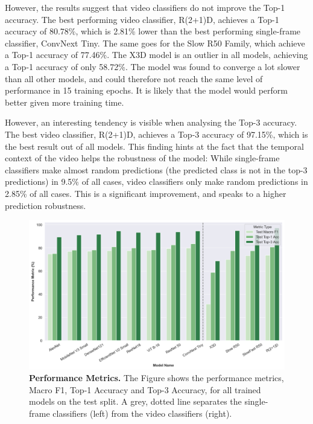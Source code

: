 \documentclass[a4paper]{article}
\begin{document}
However, the results suggest that video classifiers do not improve the Top-1
accuracy. The best performing video classifier, R(2+1)D, achieves a Top-1
accuracy of 80.78\%, which is 2.81\% lower than the best performing single-frame
classifier, ConvNext Tiny. The same goes for the Slow R50 Family, which achieve
a Top-1 accuracy of 77.46\%. The X3D model is an outlier in all models,
achieving a Top-1 accuracy of only 58.72\%. The model was found to converge a
lot slower than all other models, and could therefore not reach the same level
of performance in 15 training epochs. It is likely that the model would perform
better given more training time.

However, an interesting tendency is visible when analysing the Top-3 accuracy.
The best video classifier, R(2+1)D, achieves a Top-3 accuracy of 97.15\%, which
is the best result out of all models. This finding hints at the fact that the
temporal context of the video helps the robustness of the model: While
single-frame classifiers make almost random predictions (the predicted class is
not in the top-3 predictions) in 9.5\% of all cases, video classifiers only make
random predictions in 2.85\% of all cases. This is a significant improvement,
and speaks to a higher prediction robustness.



\begin{figure}
  \begin{center}
    \includegraphics[width=.95\textwidth]
    {./figures/performance-metrics.png}
  \end{center}

  \caption{\textbf{Performance Metrics.} The Figure shows the performance
  metrics, Macro F1, Top-1 Accuracy and Top-3 Accuracy, for all trained models
on the test split. A grey, dotted line separates the single-frame classifiers
(left) from the video classifiers (right).}

  \label{fig:performance-metrics}
\end{figure}
\end{document}
